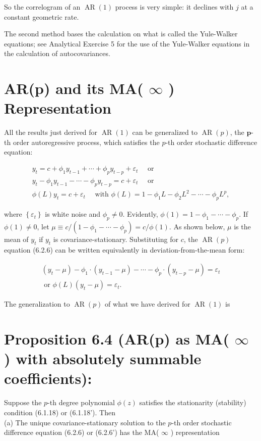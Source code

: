 \documentclass[10pt]{article}
\begin{document}
So the correlogram of an $\operatorname{AR}(1)$ process is very simple: it declines with $j$ at a constant geometric rate.

The second method bases the calculation on what is called the Yule-Walker equations; see Analytical Exercise 5 for the use of the Yule-Walker equations in the calculation of autocovariances.

\section*{AR(p) and its MA( $\infty$ ) Representation}
All the results just derived for $\operatorname{AR}(1)$ can be generalized to $\operatorname{AR}(p)$, the $\boldsymbol{p}$-th order autoregressive process, which satisfies the $p$-th order stochastic difference\\
equation:


\begin{gather*}
y_{t}=c+\phi_{1} y_{t-1}+\cdots+\phi_{p} y_{t-p}+\varepsilon_{t} \quad \text { or } \\
y_{t}-\phi_{1} y_{t-1}-\cdots-\phi_{p} y_{t-p}=c+\varepsilon_{t} \quad \text { or } \\
\phi(L) y_{t}=c+\varepsilon_{t} \quad \text { with } \phi(L)=1-\phi_{1} L-\phi_{2} L^{2}-\cdots-\phi_{p} L^{p}, \tag{6.2.6}
\end{gather*}


where $\left\{\varepsilon_{t}\right\}$ is white noise and $\phi_{p} \neq 0$. Evidently, $\phi(1)=1-\phi_{1}-\cdots-\phi_{p}$. If $\phi(1) \neq 0$, let $\mu \equiv c /\left(1-\phi_{1}-\cdots-\phi_{p}\right)=c / \phi(1)$. As shown below, $\mu$ is the mean of $y_{t}$ if $y_{t}$ is covariance-stationary. Substituting for $c$, the $\operatorname{AR}(p)$ equation (6.2.6) can be written equivalently in deviation-from-the-mean form:


\begin{gather*}
\left(y_{t}-\mu\right)-\phi_{1} \cdot\left(y_{t-1}-\mu\right)-\cdots-\phi_{p} \cdot\left(y_{t-p}-\mu\right)=\varepsilon_{t} \\
\text { or } \phi(L)\left(y_{t}-\mu\right)=\varepsilon_{t} . \tag{$\prime$}
\end{gather*}


The generalization to $\operatorname{AR}(p)$ of what we have derived for $\operatorname{AR}(1)$ is

\section*{Proposition 6.4 (AR(p) as MA( $\infty$ ) with absolutely summable coefficients):}
Suppose the $p$-th degree polynomial $\phi(z)$ satisfies the stationarity (stability) condition (6.1.18) or (6.1.18'). Then\\
(a) The unique covariance-stationary solution to the $p$-th order stochastic difference equation (6.2.6) or (6.2.6') has the MA( $\infty$ ) representation
\end{document}
